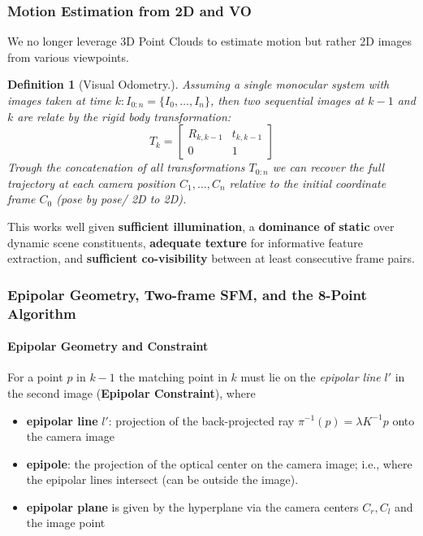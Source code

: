 \documentclass{article}
\newtheorem{definition}{Definition}
\begin{document}
\subsubsection{Motion Estimation from 2D and VO}
We no longer leverage 3D Point Clouds to estimate motion but rather 2D images from various viewpoints. 

\begin{definition}[Visual Odometry.]
    Assuming a single monocular system with images taken at time $k: I_{0:n}=\{I_0,\dots,I_n\}$, then two sequential images at $k-1$ and $k$ are relate by the rigid body transformation:
    $$
    T_k = 
    \begin{bmatrix}
        R_{k,k-1} & t_{k,k-1}\\
        0 & 1
    \end{bmatrix}
    $$
    Trough the concatenation of all transformations $T_{0:n}$ we can recover the full trajectory at each camera position $C_1, \dots ,C_n$ relative to the initial coordinate frame $C_0$ (pose by pose/ 2D to 2D).
\end{definition}

This works well given \textbf{sufficient illumination}, a \textbf{dominance of static} over dynamic scene constituents, \textbf{adequate texture} for informative feature extraction, and \textbf{sufficient co-visibility} between at least consecutive frame pairs.


\subsubsection{Epipolar Geometry, Two-frame SFM, and the 8-Point Algorithm}
\paragraph{Epipolar Geometry and Constraint}
For a point $p$ in $k-1$ the matching point in $k$ must lie on the \textit{epipolar line} $l'$ in the second image (\textbf{Epipolar Constraint}), where 
\begin{itemize}
    \item \textbf{epipolar line} $l'$: projection of the back-projected ray $\pi^{-1}(p) = \lambda K^{-1}p$ onto the camera image
    \item \textbf{epipole}: the projection of the optical center on the camera image; i.e., where the epipolar lines intersect (can be outside the image).
    \item \textbf{epipolar plane} is given by the hyperplane via the camera centers $C_r,C_l$ and the image point
\end{itemize}
\vspace{-10px}
\end{document}
